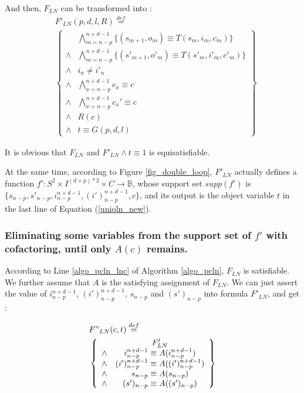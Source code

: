 \documentclass[journal]{IEEEtran}
\begin{document}
And then,
$F_{LN}$ can be transformed into :
\begin{equation}\label{uniqln_new}
\begin{split}
&F'_{LN}(p,d,l,R)\stackrel{def}{=}\\
&\left\{
\begin{array}{cc}
&\bigwedge_{m=n-p}^{n+d-1}
\{
(s_{m+1},o_m)\equiv T(s_m,i_m,c_m)
\}
\\
\wedge&\bigwedge_{m=n-p}^{n+d-1}
\{
(s'_{m+1},o'_m)\equiv T(s'_m,i'_m,c'_m)
\}
\\
\wedge& i_n\ne i'_n \\
\wedge&\bigwedge_{x=n-p}^{n+d-1}c_x\equiv c \\
\wedge&\bigwedge_{x=n-p}^{n+d-1}c_x'\equiv c \\
\wedge& R(c) \\
\wedge& t\equiv G(p,d,l)
\end{array}
\right\}
\end{split}
\end{equation}

It is obvious that $F_{LN}$ and $F'_{LN}\wedge t\equiv 1$ is equisatisfiable.

At the same time,
according to Figure \ref{fig_double_loop},
$F'_{LN}$ actually defines a function $f':S^{2}\times I^{(d+p)*2}\times C\to \mathbb{B}$,
whose support set $supp(f')$ is $\{s_{n-p},s'_{n-p},i_{n-p}^{n+d-1},(i')_{n-p}^{n+d-1},c\}$,
and its output is the object variable $t$ in the last line of Equation (\ref{uniqln_new}).

\subsubsection{\textbf{Eliminating some variables from the support set of $f'$ with cofactoring\cite{Cofact}, until only $A(c)$ remains.}}
According to Line \ref{algo_pcln_lnc} of Algorithm \ref{algo_pcln},
$F_{LN}$ is satisfiable.
We further assume that $A$ is the satisfying assignment of $F_{LN}$.
We can just assert the value of $i_{n-p}^{n+d-1}$, $(i')_{n-p}^{n+d-1}$, $s_{n-p}$ and $(s')_{n-p}$ into formula $F'_{LN}$,
and get :

\begin{equation}\label{equ_char}
\begin{split}
&F"_{LN}(c,t)\stackrel{def}{=}\\
&\left\{
\begin{array}{cc}
& F'_{LN}\\
\wedge& i_{n-p}^{n+d-1}\equiv A(i_{n-p}^{n+d-1})\\
\wedge& (i')_{n-p}^{n+d-1}\equiv A((i')_{n-p}^{n+d-1})\\
\wedge& s_{n-p}\equiv A(s_{n-p})\\
\wedge& (s')_{n-p}\equiv A((s')_{n-p})
\end{array}
\right\}
\end{split}
\end{equation}
\end{document}
